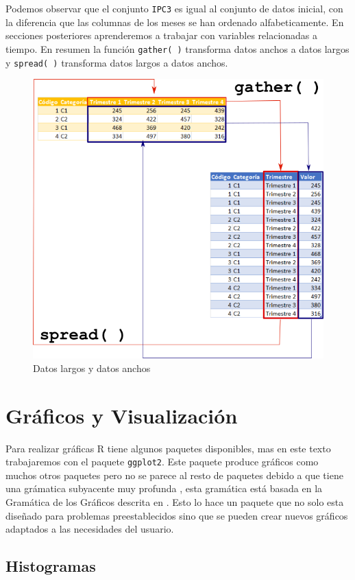 \documentclass[letterpaper,]{book}
\begin{document}
Podemos observar que el conjunto \texttt{IPC3} es igual al conjunto de datos inicial, con la diferencia que las columnas de los meses se han ordenado alfabeticamente. En secciones posteriores aprenderemos a trabajar con variables relacionadas a tiempo. En resumen la función \texttt{gather(\ )} transforma datos anchos a datos largos y \texttt{spread(\ )} transforma datos largos a datos anchos.

\begin{figure}[!h]

{\centering \includegraphics[width=0.5\linewidth]{gat_spr} 

}

\caption{Datos largos y datos anchos}\label{fig:gatspr}
\end{figure}

\newpage

\hypertarget{graficos-y-visualizacion}{%
\section{Gráficos y Visualización}\label{graficos-y-visualizacion}}

Para realizar gráficas R tiene algunos paquetes disponibles, mas en este texto trabajaremos con el paquete \texttt{ggplot2}. Este paquete produce gráficos como muchos otros paquetes pero no se parece al resto de paquetes debido a que tiene una grámatica subyacente muy profunda \citep{wickham2016}, esta gramática está basada en la Gramática de los Gráficos descrita en \citet{wilkinson2005}. Esto lo hace un paquete que no solo esta diseñado para problemas preestablecidos sino que se pueden crear nuevos gráficos adaptados a las necesidades del usuario.

\hypertarget{histogramas}{%
\subsection{Histogramas}\label{histogramas}}
\end{document}
